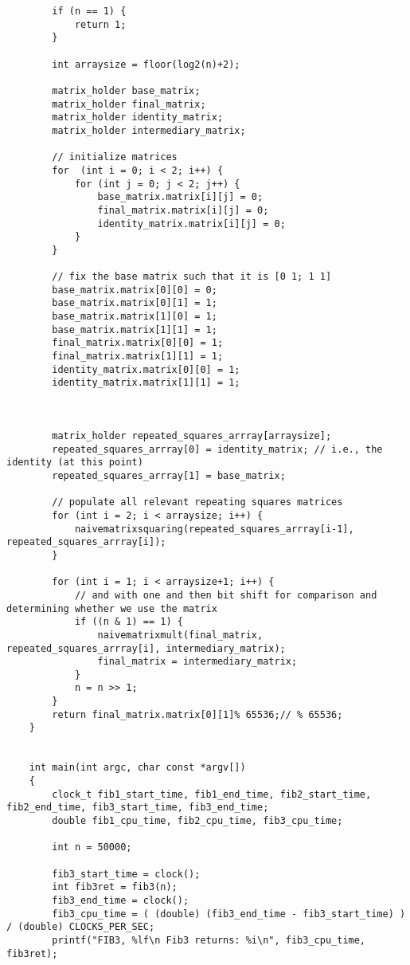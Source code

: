 \documentclass[11pt]{article}
\begin{document}
\begin{enumerate}
\begin{verbatim}
        if (n == 1) {
            return 1;
        }
    
        int arraysize = floor(log2(n)+2);

        matrix_holder base_matrix;
        matrix_holder final_matrix;
        matrix_holder identity_matrix;
        matrix_holder intermediary_matrix;
    
        // initialize matrices
        for  (int i = 0; i < 2; i++) {
            for (int j = 0; j < 2; j++) {
                base_matrix.matrix[i][j] = 0;
                final_matrix.matrix[i][j] = 0;
                identity_matrix.matrix[i][j] = 0;
            }
        }
    
        // fix the base matrix such that it is [0 1; 1 1]
        base_matrix.matrix[0][0] = 0;
        base_matrix.matrix[0][1] = 1;
        base_matrix.matrix[1][0] = 1;
        base_matrix.matrix[1][1] = 1;
        final_matrix.matrix[0][0] = 1;
        final_matrix.matrix[1][1] = 1;
        identity_matrix.matrix[0][0] = 1;
        identity_matrix.matrix[1][1] = 1;
    
    
    
        matrix_holder repeated_squares_arrray[arraysize];
        repeated_squares_arrray[0] = identity_matrix; // i.e., the identity (at this point)
        repeated_squares_arrray[1] = base_matrix;
    
        // populate all relevant repeating squares matrices
        for (int i = 2; i < arraysize; i++) {
            naivematrixsquaring(repeated_squares_arrray[i-1], repeated_squares_arrray[i]);
        }
    
        for (int i = 1; i < arraysize+1; i++) {
            // and with one and then bit shift for comparison and determining whether we use the matrix
            if ((n & 1) == 1) {
                naivematrixmult(final_matrix, repeated_squares_arrray[i], intermediary_matrix);
                final_matrix = intermediary_matrix;
            }
            n = n >> 1;
        }
        return final_matrix.matrix[0][1]% 65536;// % 65536;
    }
    
    
    int main(int argc, char const *argv[])
    {
        clock_t fib1_start_time, fib1_end_time, fib2_start_time, fib2_end_time, fib3_start_time, fib3_end_time;
        double fib1_cpu_time, fib2_cpu_time, fib3_cpu_time;
        
        int n = 50000;
    
        fib3_start_time = clock();
        int fib3ret = fib3(n);
        fib3_end_time = clock();
        fib3_cpu_time = ( (double) (fib3_end_time - fib3_start_time) ) / (double) CLOCKS_PER_SEC;
        printf("FIB3, %lf\n Fib3 returns: %i\n", fib3_cpu_time, fib3ret);
    

\end{verbatim}
\end{enumerate}
\end{document}
